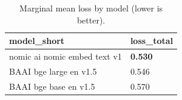 \begin{table}[t]
\centering
\small
\begin{tabular}{l l}
\toprule
model_short & loss_total \\
\midrule
nomic ai nomic embed text v1 & \textbf{0.530} \\
BAAI bge large en v1.5 & 0.546 \\
BAAI bge base en v1.5 & 0.570 \\
\bottomrule
\end{tabular}
\caption{Marginal mean loss by model (lower is better).}
\label{tab:marginal_model}
\end{table}